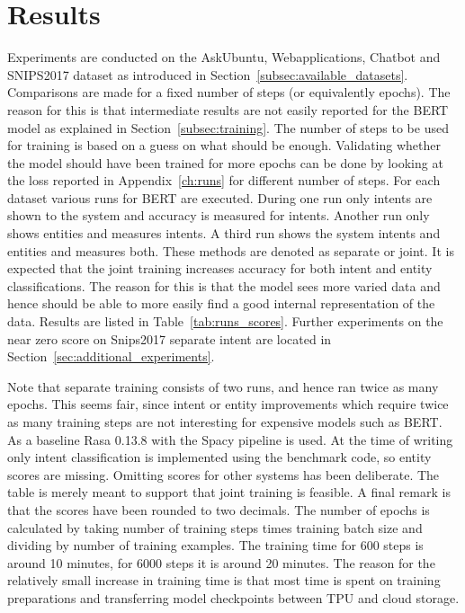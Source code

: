 \section{Results}
\label{sec:results}

Experiments are conducted on the AskUbuntu, Webapplications, Chatbot and SNIPS2017 dataset as introduced in Section~\ref{subsec:available_datasets}.
Comparisons are made for a fixed number of steps (or equivalently epochs).
The reason for this is that intermediate results are not easily reported for the BERT model as explained in Section~\ref{subsec:training}.
The number of steps to be used for training is based on a guess on what should be enough.
Validating whether the model should have been trained for more epochs can be done by looking at the loss reported in Appendix~\ref{ch:runs} for different number of steps.
For each dataset various runs for BERT are executed.
During one run only intents are shown to the system and accuracy is measured for intents.
Another run only shows entities and measures intents.
A third run shows the system intents and entities and measures both.
These methods are denoted as separate or joint.
It is expected that the joint training increases accuracy for both intent and entity classifications.
The reason for this is that the model sees more varied data and hence should be able to more easily find a good internal representation of the data.
Results are listed in Table~\ref{tab:runs_scores}.
Further experiments on the near zero score on Snips2017 separate intent are located in Section~\ref{sec:additional_experiments}.

Note that separate training consists of two runs, and hence ran twice as many epochs.
This seems fair, since intent or entity improvements which require twice as many training steps are not interesting for expensive models such as BERT.
As a baseline Rasa 0.13.8 with the Spacy pipeline is used.
At the time of writing only intent classification is implemented using the benchmark code, so entity scores are missing.
Omitting scores for other systems has been deliberate.
The table is merely meant to support that joint training is feasible.
A final remark is that the scores have been rounded to two decimals.
The number of epochs is calculated by taking number of training steps times training batch size and dividing by number of training examples.
The training time for 600 steps is around 10 minutes, for 6000 steps it is around 20 minutes.
The reason for the relatively small increase in training time is that most time is spent on training preparations and transferring model checkpoints between TPU and cloud storage.

